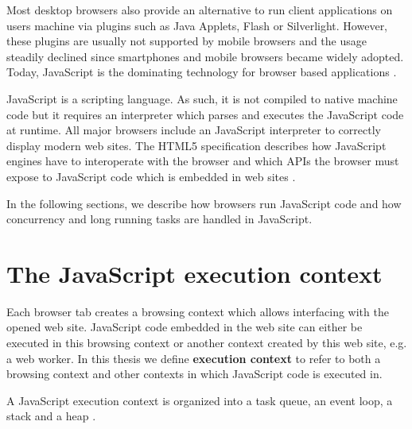\documentclass[
	ruledheaders=section,%
	class=report,%
	thesis={type=bachelor},%
	accentcolor=9c,%
	custommargins=true,%
	marginpar=false,%
	parskip=half-,%
	fontsize=11pt,%
]{tudapub}
\begin{document}
  Most desktop browsers also provide an alternative to run client applications on users machine via plugins such as Java Applets, Flash or Silverlight. However, these plugins are usually not supported by mobile browsers and the usage steadily declined since smartphones and mobile browsers became widely adopted. Today, JavaScript is the dominating technology for browser based applications \cite{browser-plugin-usage}.

  JavaScript is a scripting language. As such, it is not compiled to native machine code but it requires an interpreter which parses and executes the JavaScript code at runtime. All major browsers include an JavaScript interpreter to correctly display modern web sites. The HTML5 specification describes how JavaScript engines have to interoperate with the browser and which APIs the browser must expose to JavaScript code which is embedded in web sites \cite{html5-specification}.

  In the following sections, we describe how browsers run JavaScript code and how concurrency and long running tasks are handled in JavaScript.

  \section{The JavaScript execution context}

  Each browser tab creates a browsing context which allows interfacing with the opened web site. JavaScript code embedded in the web site can either be executed in this browsing context or another context created by this web site, e.g. a web worker. In this thesis we define \textbf{execution context} to refer to both a browsing context and other contexts in which JavaScript code is executed in.

  A JavaScript execution context is organized into a task queue, an event loop, a stack and a heap \cite{mdn-event-loop}.
\end{document}
